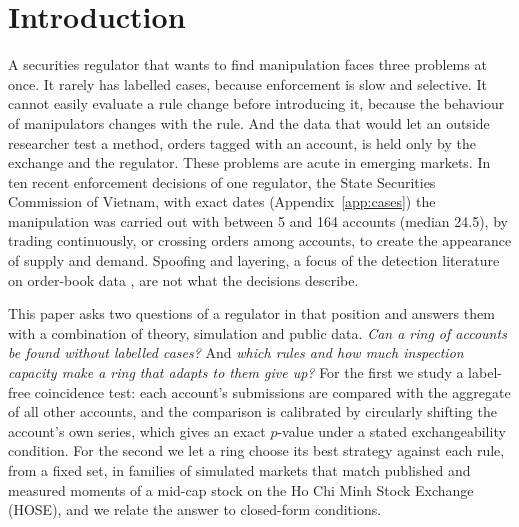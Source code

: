 \section{Introduction}\label{sec:intro}

A securities regulator that wants to find manipulation faces three problems at once. It rarely has labelled cases, because enforcement is slow and selective. It cannot easily evaluate a rule change before introducing it, because the behaviour of manipulators changes with the rule. And the data that would let an outside researcher test a method, orders tagged with an account, is held only by the exchange and the regulator. These problems are acute in emerging markets. In ten recent enforcement decisions of one regulator, the State Securities Commission of Vietnam, with exact dates (Appendix~\ref{app:cases}) the manipulation was carried out with between 5 and 164 accounts (median 24.5), by trading continuously, or crossing orders among accounts, to create the appearance of supply and demand. Spoofing and layering, a focus of the detection literature on order-book data \citep{tuccella2021,fabre2025}, are not what the decisions describe.

This paper asks two questions of a regulator in that position and answers them with a combination of theory, simulation and public data. \emph{Can a ring of accounts be found without labelled cases?} And \emph{which rules and how much inspection capacity make a ring that adapts to them give up?} For the first we study a label-free coincidence test: each account's submissions are compared with the aggregate of all other accounts, and the comparison is calibrated by circularly shifting the account's own series, which gives an exact $p$-value under a stated exchangeability condition. For the second we let a ring choose its best strategy against each rule, from a fixed set, in families of simulated markets that match published and measured moments of a mid-cap stock on the Ho Chi Minh Stock Exchange (HOSE), and we relate the answer to closed-form conditions.

